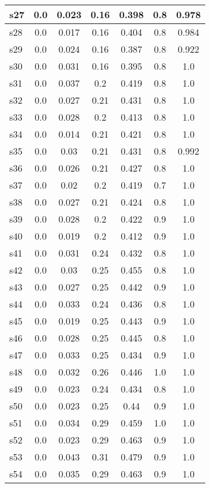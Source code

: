\documentclass{article}
\begin{document}
\begin{tabular}{|l|c|c|c|c|c|c|}
\hline
s27 &0.0 & 0.023 & 0.16 & 0.398 & 0.8 & 0.978\\
\hline
s28 &0.0 & 0.017 & 0.16 & 0.404 & 0.8 & 0.984\\
\hline
s29 &0.0 & 0.024 & 0.16 & 0.387 & 0.8 & 0.922\\
\hline
s30 &0.0 & 0.031 & 0.16 & 0.395 & 0.8 & 1.0\\
\hline
s31 &0.0 & 0.037 & 0.2 & 0.419 & 0.8 & 1.0\\
\hline
s32 &0.0 & 0.027 & 0.21 & 0.431 & 0.8 & 1.0\\
\hline
s33 &0.0 & 0.028 & 0.2 & 0.413 & 0.8 & 1.0\\
\hline
s34 &0.0 & 0.014 & 0.21 & 0.421 & 0.8 & 1.0\\
\hline
s35 &0.0 & 0.03 & 0.21 & 0.431 & 0.8 & 0.992\\
\hline
s36 &0.0 & 0.026 & 0.21 & 0.427 & 0.8 & 1.0\\
\hline
s37 &0.0 & 0.02 & 0.2 & 0.419 & 0.7 & 1.0\\
\hline
s38 &0.0 & 0.027 & 0.21 & 0.424 & 0.8 & 1.0\\
\hline
s39 &0.0 & 0.028 & 0.2 & 0.422 & 0.9 & 1.0\\
\hline
s40 &0.0 & 0.019 & 0.2 & 0.412 & 0.9 & 1.0\\
\hline
s41 &0.0 & 0.031 & 0.24 & 0.432 & 0.8 & 1.0\\
\hline
s42 &0.0 & 0.03 & 0.25 & 0.455 & 0.8 & 1.0\\
\hline
s43 &0.0 & 0.027 & 0.25 & 0.442 & 0.9 & 1.0\\
\hline
s44 &0.0 & 0.033 & 0.24 & 0.436 & 0.8 & 1.0\\
\hline
s45 &0.0 & 0.019 & 0.25 & 0.443 & 0.9 & 1.0\\
\hline
s46 &0.0 & 0.028 & 0.25 & 0.445 & 0.8 & 1.0\\
\hline
s47 &0.0 & 0.033 & 0.25 & 0.434 & 0.9 & 1.0\\
\hline
s48 &0.0 & 0.032 & 0.26 & 0.446 & 1.0 & 1.0\\
\hline
s49 &0.0 & 0.023 & 0.24 & 0.434 & 0.8 & 1.0\\
\hline
s50 &0.0 & 0.023 & 0.25 & 0.44 & 0.9 & 1.0\\
\hline
s51 &0.0 & 0.034 & 0.29 & 0.459 & 1.0 & 1.0\\
\hline
s52 &0.0 & 0.023 & 0.29 & 0.463 & 0.9 & 1.0\\
\hline
s53 &0.0 & 0.043 & 0.31 & 0.479 & 0.9 & 1.0\\
\hline
s54 &0.0 & 0.035 & 0.29 & 0.463 & 0.9 & 1.0\\

\end{tabular}
\end{document}
